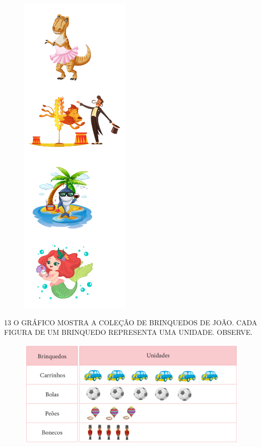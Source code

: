 \begin{figure}[htpb!]
\includegraphics[scale=.9]{./media/SAEB_1ANO_MAT_FIGURA125.png}
\end{figure}

\pagebreak
\num{13} O GRÁFICO MOSTRA A COLEÇÃO DE BRINQUEDOS DE JOÃO. CADA FIGURA DE UM
BRINQUEDO REPRESENTA UMA UNIDADE. OBSERVE.

\begin{figure}[htpb!]
\includegraphics[width=\textwidth]{./media/SAEB_1ANO_MAT_FIGURA126.png}
\end{figure}

